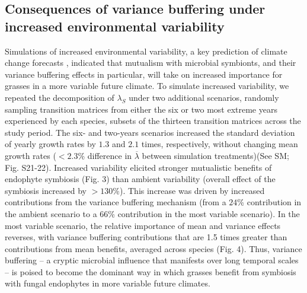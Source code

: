 \documentclass[9pt,twocolumn,twoside]{pnas-new}
\begin{document}
\subsection*{Consequences of variance buffering under increased environmental variability} Simulations of increased environmental variability, a key prediction of climate change forecasts \cite{ipcc_2021}, indicated that mutualism with microbial symbionts, and their variance buffering effects in particular, will take on increased importance for grasses in a more variable future climate.
To simulate increased variability, we repeated the decomposition of $\lambda_{S}$ under two additional scenarios, randomly sampling transition matrices from either the six or two most extreme years experienced by each species, subsets of the thirteen transition matrices across the study period. 
The six- and two-years scenarios increased the standard deviation of yearly growth rates by $1.3$ and $2.1$ times, respectively, without changing mean growth rates ($<2.3$\% difference in $\overline{\lambda}$ between simulation treatments)(See SM; Fig. S21-22).
Increased variability elicited stronger mutualistic benefits of endophyte symbiosis (Fig. 3) than ambient variability (overall effect of the symbiosis increased by $>130 $\%).
This increase was driven by increased contributions from the variance buffering mechanism (from a $24$\% contribution in the ambient scenario to a $66$\% contribution in the most variable scenario).
In the most variable scenario, the relative importance of mean and variance effects reverses, with variance buffering contributions that are 1.5 times greater than contributions from mean benefits, averaged across species (Fig. 4). 
Thus, variance buffering -- a cryptic microbial influence that manifests over long temporal scales -- is poised to become the dominant way in which grasses benefit from symbiosis with fungal endophytes in more variable future climates. 
\end{document}
